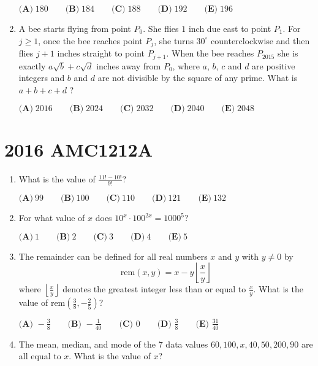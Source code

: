 \documentclass{article}
\begin{document}
\begin{enumerate}[label=\arabic*., itemsep=0.5em]
\(\textbf{(A)}\; 180 \qquad\textbf{(B)}\; 184 \qquad\textbf{(C)}\; 188 \qquad\textbf{(D)}\; 192\qquad\textbf{(E)}\; 196\)\par \vspace{0.5em}\item A bee starts flying from point \(P_0\). She flies \(1\) inch due east to point \(P_1\). For \(j \ge 1\), once the bee reaches point \(P_j\), she turns \(30^{\circ}\) counterclockwise and then flies \(j+1\) inches straight to point \(P_{j+1}\). When the bee reaches \(P_{2015}\) she is exactly \(a \sqrt{b} + c \sqrt{d}\) inches away from \(P_0\), where \(a\), \(b\), \(c\) and \(d\) are positive integers and \(b\) and \(d\) are not divisible by the square of any prime. What is \(a+b+c+d\) ?

\(\textbf{(A)}\; 2016 \qquad\textbf{(B)}\; 2024 \qquad\textbf{(C)}\; 2032 \qquad\textbf{(D)}\; 2040 \qquad\textbf{(E)}\; 2048\)\par \vspace{0.5em}\end{enumerate}\newpage\section*{2016 AMC1212A}\begin{enumerate}[label=\arabic*., itemsep=0.5em]\item What is the value of \(\frac{11!-10!}{9!}\)?

\(\textbf{(A)}\ 99\qquad\textbf{(B)}\ 100\qquad\textbf{(C)}\ 110\qquad\textbf{(D)}\ 121\qquad\textbf{(E)}\ 132\)\par \vspace{0.5em}\item For what value of \(x\) does \(10^x \cdot 100^{2x} = 1000^5\)?

\(\textbf{(A)}\ 1\qquad\textbf{(B)}\ 2\qquad\textbf{(C)}\ 3\qquad\textbf{(D)}\ 4\qquad\textbf{(E)}\ 5\)\par \vspace{0.5em}\item The remainder can be defined for all real numbers \(x\) and \(y\) with \(y \neq 0\) by 
\begin{equation*}
\text{rem} (x ,y)=x-y\left \lfloor \frac{x}{y} \right \rfloor
\end{equation*}
where \(\left \lfloor \tfrac{x}{y} \right \rfloor\) denotes the greatest integer less than or equal to \(\tfrac{x}{y}\). What is the value of \(\text{rem} (\tfrac{3}{8}, -\tfrac{2}{5} )\)?

\(\textbf{(A) } -\frac{3}{8} \qquad \textbf{(B) } -\frac{1}{40} \qquad \textbf{(C) } 0 \qquad \textbf{(D) } \frac{3}{8} \qquad \textbf{(E) } \frac{31}{40}\)\par \vspace{0.5em}\item The mean, median, and mode of the \(7\) data values \(60, 100, x, 40, 50, 200, 90\) are all equal to \(x\). What is the value of \(x\)?


\end{enumerate}
\end{document}

